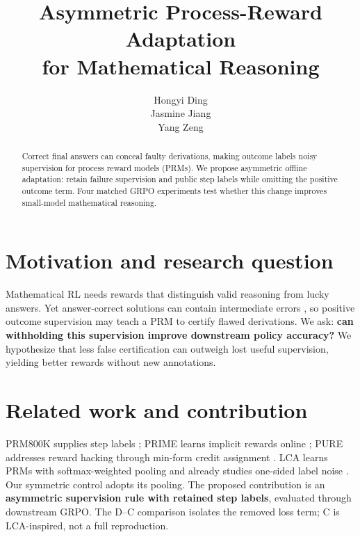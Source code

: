 \documentclass{article}
\title{Asymmetric Process-Reward Adaptation\\for Mathematical Reasoning}
\author{
Hongyi Ding \\
\And
Jasmine Jiang \\
\And
Yang Zeng \\
}
\begin{document}
\maketitle
\begin{abstract}
Correct final answers can conceal faulty derivations, making outcome labels noisy supervision for process reward models (PRMs). We propose asymmetric offline adaptation: retain failure supervision and public step labels while omitting the positive outcome term. Four matched GRPO experiments test whether this change improves small-model mathematical reasoning.
\end{abstract}

\section{Motivation and research question}
Mathematical RL needs rewards that distinguish valid reasoning from lucky answers. Yet answer-correct solutions can contain intermediate errors \citep{zheng2025}, so positive outcome supervision may teach a PRM to certify flawed derivations. We ask: \textbf{can withholding this supervision improve downstream policy accuracy?} We hypothesize that less false certification can outweigh lost useful supervision, yielding better rewards without new annotations.

\section{Related work and contribution}
PRM800K supplies step labels \citep{lightman2023}; PRIME learns implicit rewards online \citep{cui2025}; PURE addresses reward hacking through min-form credit assignment \citep{cheng2025}. LCA learns PRMs with softmax-weighted pooling and already studies one-sided label noise \citep{jia2026}. Our symmetric control adopts its pooling. The proposed contribution is an \textbf{asymmetric supervision rule with retained step labels}, evaluated through downstream GRPO. The D--C comparison isolates the removed loss term; C is LCA-inspired, not a full reproduction.
\end{document}
